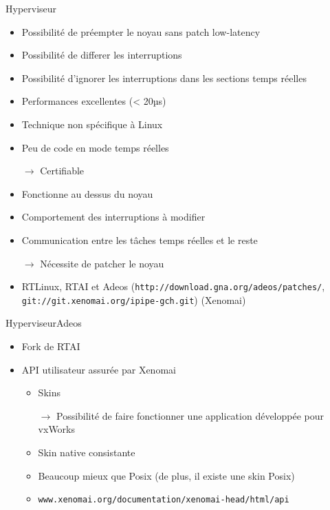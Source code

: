 \begin{frame}[fagile]{Hyperviseur}
  \begin{itemize}
   \item Possibilité de préempter le noyau sans patch low-latency
   \item Possibilité de differer les interruptions
   \item  Possibilité d'ignorer  les interruptions  dans  les sections
     temps réelles
   \item Performances excellentes (< 20µs)
   \item Technique non spécifique à Linux
   \item Peu de code en mode temps réelles
   \item[$\to$] Certifiable

   \item Fonctionne au dessus du noyau
   \item Comportement des interruptions à modifier
   \item Communication entre les tâches temps réelles et le reste
   \item[$\to$] Nécessite de patcher le noyau
   
   \item           RTLinux,           RTAI          et           Adeos
     (\texttt{http://download.gna.org/adeos/patches/},
     \texttt{git://git.xenomai.org/ipipe-gch.git}) (Xenomai)
  \end{itemize}
\end{frame}

\begin{frame}{Hyperviseur}{Adeos}
  \begin{itemize}
    \item Fork de RTAI
    \item API utilisateur assurée par Xenomai
    \begin{itemize}
      \item Skins 
      \item[$\to$] Possibilité de faire fonctionner une application développée pour vxWorks
      \item Skin native consistante
      \item Beaucoup mieux que Posix (de plus, il existe une skin Posix)
      \item \texttt{www.xenomai.org/documentation/xenomai-head/html/api}
    \end{itemize}
  \end{itemize}
\end{frame}

